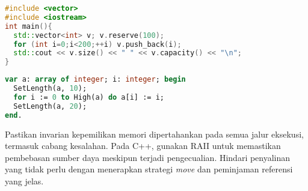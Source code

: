 \documentclass[../main.tex]{subfiles}
\begin{document}
\begin{lstlisting}[language=C++, caption={std::vector di C++}]
#include <vector>
#include <iostream>
int main(){
  std::vector<int> v; v.reserve(100);
  for (int i=0;i<200;++i) v.push_back(i);
  std::cout << v.size() << " " << v.capacity() << "\n";
}
\end{lstlisting}

\begin{lstlisting}[language=Pascal, caption={Array dinamis di Free Pascal}]
var a: array of integer; i: integer; begin
  SetLength(a, 10);
  for i := 0 to High(a) do a[i] := i;
  SetLength(a, 20);
end.
\end{lstlisting}

Pastikan invarian kepemilikan memori dipertahankan pada semua jalur eksekusi, termasuk cabang kesalahan. Pada C++, gunakan RAII untuk memastikan pembebasan sumber daya meskipun terjadi pengecualian. Hindari penyalinan yang tidak perlu dengan menerapkan strategi \emph{move} dan peminjaman referensi yang jelas.
\end{document}
